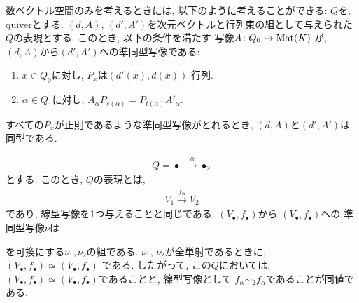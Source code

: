 \begin{remark}
数ベクトル空間のみを考えるときには,
以下のように考えることができる:
$Q$を, quiverとする.
$(d,A)$, $(d',A')$を次元ベクトルと行列束の組として与えられた$Q$の表現とする.
このとき,
以下の条件を満たす
写像$A\colon Q_0 \to \operatorname{Mat}(K)$
が, $(d,A)$から$(d',A')$への準同型写像である:
\begin{enumerate}
\item $x\in Q_0$に対し, $P_x$は$(d'(x),d(x))$-行列.
\item $\alpha\in Q_1$に対し, $A_\alpha P_{s(\alpha)}= P_{t(\alpha)}A'_\alpha$.
\end{enumerate}
すべての$P_x$が正則であるような準同型写像がとれるとき,
$(d,A)$と$(d',A')$は同型である.
\end{remark}

\begin{example}
  \begin{align*}
    Q=\bullet_{1} \xrightarrow{\alpha} \bullet_{2}
  \end{align*}
  とする.
  このとき, $Q$の表現とは,
  \begin{align*}
    V_1 \xrightarrow{f_\alpha} V_{2}
  \end{align*}
  であり,
  線型写像を1つ与えることと同じである.
  $(V_\bullet,f_\bullet)$から
  $(V_\bullet,f_\bullet)$への
  準同型写像$\nu$は
  \begin{center}
  \end{center}
  を可換にする$\nu_1,\nu_2$の組である.
  $\nu_1$, $\nu_2$が全単射であるときに,
  $(V_\bullet,f_\bullet)\simeq (V_\bullet,f_\bullet)$
  である.
  したがって, この$Q$においては,
  $(V_\bullet,f_\bullet)\simeq (V_\bullet,f_\bullet)$であることと,
  線型写像として
  $f_\alpha \sim_2 f_\alpha$であることが同値である.  
\end{example}


